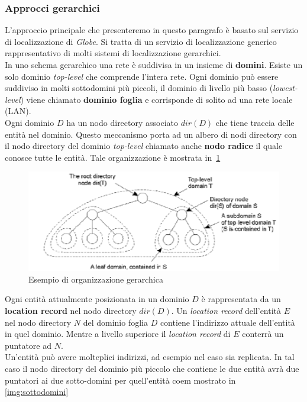 \subsubsection{Approcci gerarchici}
L'approccio principale che presenteremo in questo paragrafo è basato sul servizio di localizzazione di \emph{Globe}. Si tratta di un servizio di localizzazione generico rappresentativo di molti sistemi di localizzazione gerarchici.\\
In uno schema gerarchico una rete è suddivisa in un insieme di \textbf{domini}. Esiste un solo dominio \emph{top-level} che comprende l'intera rete. Ogni dominio può essere suddiviso in molti sottodomini più piccoli, il dominio di livello più basso (\emph{lowest-level}) viene chiamato \textbf{dominio foglia} e corrisponde di solito ad una rete locale (LAN).\\
Ogni dominio $D$ ha un nodo directory associato $dir(D)$ che tiene traccia delle entità nel dominio. Questo meccanismo porta ad un albero di nodi directory con il nodo directory del dominio \emph{top-level} chiamato anche \textbf{nodo radice} il quale conosce tutte le entità. Tale organizzazione è mostrata in \figurename\,\ref{img:gerarchica}\\
\begin{figure}
\centering
\includegraphics[scale=0.4]{img/gerarchico.png}
\caption{Esempio di organizzazione gerarchica}\label{img:gerarchica}
\end{figure}
Ogni entità attualmente posizionata in un dominio $D$ è rappresentata da un \textbf{location record} nel nodo directory $dir(D)$. Un \emph{location record} dell'entità $E$ nel nodo directory $N$ del dominio foglia $D$ contiene l'indirizzo attuale dell'entità in quel dominio. Mentre a livello superiore il \emph{location record} di $E$ conterrà un puntatore ad $N$.\\
Un'entità può avere molteplici indirizzi, ad esempio nel caso sia replicata. In tal caso il nodo directory del dominio più piccolo che contiene le due entità avrà due puntatori ai due sotto-domini per quell'entità coem mostrato in \figurename\,\ref{img:sottodomini}
